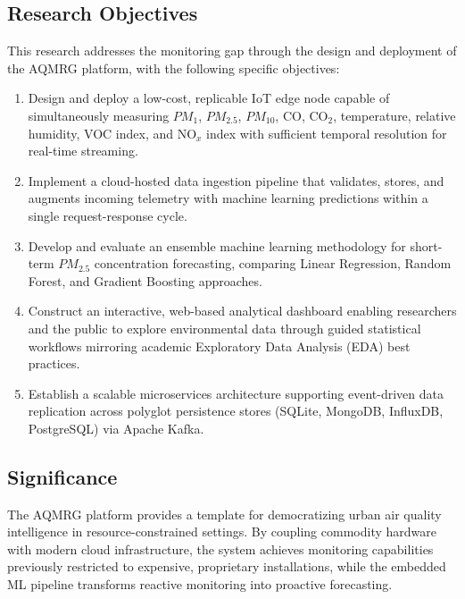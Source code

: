 \documentclass[12pt,a4paper]{article}
\begin{document}
\subsection{Research Objectives}
This research addresses the monitoring gap through the design and deployment of the AQMRG platform, with the following specific objectives:
\begin{enumerate}
    \item Design and deploy a low-cost, replicable IoT edge node capable of simultaneously measuring $PM_1$, $PM_{2.5}$, $PM_{10}$, CO, CO$_2$, temperature, relative humidity, VOC index, and NO$_x$ index with sufficient temporal resolution for real-time streaming.
    \item Implement a cloud-hosted data ingestion pipeline that validates, stores, and augments incoming telemetry with machine learning predictions within a single request-response cycle.
    \item Develop and evaluate an ensemble machine learning methodology for short-term $PM_{2.5}$ concentration forecasting, comparing Linear Regression, Random Forest, and Gradient Boosting approaches.
    \item Construct an interactive, web-based analytical dashboard enabling researchers and the public to explore environmental data through guided statistical workflows mirroring academic Exploratory Data Analysis (EDA) best practices.
    \item Establish a scalable microservices architecture supporting event-driven data replication across polyglot persistence stores (SQLite, MongoDB, InfluxDB, PostgreSQL) via Apache Kafka.
\end{enumerate}

\subsection{Significance}
The AQMRG platform provides a template for democratizing urban air quality intelligence in resource-constrained settings. By coupling commodity hardware with modern cloud infrastructure, the system achieves monitoring capabilities previously restricted to expensive, proprietary installations, while the embedded ML pipeline transforms reactive monitoring into proactive forecasting.
\end{document}
